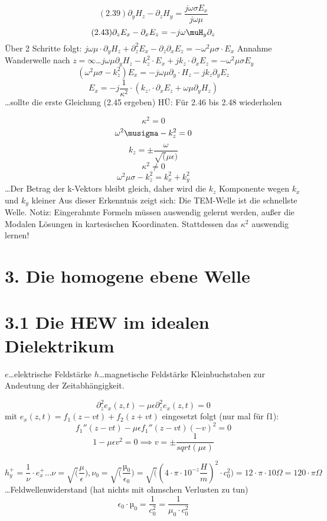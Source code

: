 \documentclass[a4paper]{article}
\begin{document}
\[(2.39) \partial_{y} H_{z} - \partial_{z} H_{y}= \frac{j\omega\sigma E_{x}}{j\omega\mu}\]
\[(2.43) \partial_{z}E_{x} - \partial_{x}E_{z} = -j\omega\muH_{y} \partial_{z}\]
Über 2 Schritte folgt: $j\omega\mu\cdot \partial_{y}H_{z}+\partial_{z}^2 E_{x}-\partial_{z}\partial_{x}E_{z} = -\omega^2\mu\sigma\cdot E_{x}$\newline
Annahme Wanderwelle nach $z=\infty$\ldots $j\omega\mu \partial_{y}H_{z} - k_{z}^2\cdot E_{x} + jk_{z}\cdot \partial_{x}E_{z}=-\omega^2\mu\sigma E_{y}$
\[(\omega^2\mu\sigma-k_{z}^2)E_{x} = -j\omega\mu \partial_{y}\cdot H_{z}-jk_{z} \partial_{y}E_{z}\]
\[E_{x}=-j\frac{1}{\kappa^2}\cdot (k_{z}.\cdot \partial_{x}E_{z}+\omega\mu\partial_{y}H_{z})\]\ldots sollte die erste Gleichung (2.45 ergeben)
HÜ: Für 2.46 bis 2.48 wiederholen

\[\kappa^2=0\]
\[\omega^2\musigma-k_{z}^2=0\]
\[k_{z}=\pm \frac{\omega}{\sqrt(\mu\epsilon)}\]
\[\kappa^2\neq 0\]
\[\omega^2\mu\sigma-k_{z}^2=k_{x}^2+ k_{y}^2\]\ldots Der Betrag der k-Vektors bleibt gleich, daher wird die $k_{z}$ Komponente wegen $k_{x}$ und $k_{y}$ kleiner
Aus dieser Erkenntnis zeigt sich: Die TEM-Welle ist die schnellste Welle.
Notiz: Eingerahmte Formeln müssen auswendig gelernt werden, außer die Modalen Lösungen in kartesischen Koordinaten.\newline
Stattdessen das $\kappa^2$ auswendig lernen!

\section*{3. Die homogene ebene Welle}
\section*{3.1 Die HEW im idealen Dielektrikum}
$e$\ldots elektrische Feldstärke\newline
$h$\ldots magnetische Feldstärke\newline
Kleinbuchstaben zur Andeutung der Zeitabhängigkeit.

\[\partial_{z}^2 e_{x}(z,t) - \mu\epsilon\partial_{z}^2 e_{x}(z,t) = 0\]
mit $e_x(z,t)=f_{1}(z-vt)+f_{2}(z+vt)$ eingesetzt folgt (nur mal für f1):
\[f_{1}''(z-vt)-\mu\epsilon f_{1}''(z-vt)(-v)^2=0\]
\[1-\mu\epsilon v^2 = 0 \implies v=\pm\frac{1}{sqrt(\mu\epsilon)}\]

\[h_{y}^+=\frac{1}{\nu}\cdot e_x^+\ldots \nu=\sqrt(\frac{\mu}{\epsilon}), \nu_{0}=\sqrt(\frac{µ_{0}}{\epsilon_{0}})=\sqrt((4\cdot \pi\cdot 10^{-z}\frac{H}{m})^2\cdot c_{0}^2)=12\cdot \pi\cdot 10 \Omega = 120\cdot \pi\Omega\] \ldots Feldwellenwiderstand (hat nichts mit ohmschen Verlusten zu tun)
\[\epsilon_{0}\cdot µ_{0}=\frac{1}{c_{0}^2} = \frac{1}{\mu_{0}\cdot c_{0}^2}\]
\end{document}
